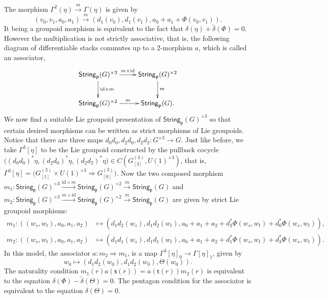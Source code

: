\documentclass[letterpaper,10pt, oneside]{article} %
\newcommand{\String}{\mathsf{String}}%
\newcommand{\bs}{\mathsf{s}}%
\newcommand{\bt}{\mathsf{t}}%
\newcommand{\frkp}{\mathfrak p}
\newcommand{\pp}{\frkp} %
\newcommand{\id}{\mathrm{id}}
\begin{document}
The morphism $\Gamma^2(\eta)\stackrel{m}{\longrightarrow}\Gamma(\eta)$
is given by
$$
(v_0,v_1,a_0,a_1)\stackrel{m}{\longrightarrow} (d_1(v_0),d_1(v_1),a_0+a_1+\Phi(v_0,v_1)).
$$It being a groupoid morphism is equivalent to the fact that
$\delta(\eta)+\check{\delta}(\Phi)=0$. However the multiplication is not
strictly associative, that is, the following diagram of differentiable stacks commutes up to a
2-morphism $a$, which is called an associator,
\[
 \xymatrix{\String_\pp(G)^{\times 3}\ar[r]^{m\times \id}\ar[d]^{\id\times m}&\String_\pp(G)^{\times 2}\ar[d]^{  m}\\
 \String_\pp(G)^{\times 2}\ar[r]^{  m}&\String_\pp(G).
 }
 \]
We now find a suitable Lie groupoid presentation of
$\String_\pp(G)^{\times 3}$ so that certain desired morphisms can be
written as strict morphisms of Lie groupoids. Notice that there are
three maps
$d_0d_0, d_2d_0, d_2d_2:G^{\times 3}\longrightarrow G$. Just like before, we take
$\Gamma^3[\eta]$
to be the Lie groupoid constructed by the pullback cocycle
$\big( (d_0d_0)^*\eta,(d_2d_0)^*\eta,(d_2d_2)^*\eta \big) \in
C(G^{(3)}_{[3]}, {\underline{U(1)}}^{\times 3})$,
that is, $
\Gamma^3[\eta]=\Big( G^{(3)}_{[1]}\times {U(1)}^{\times 3}\Longrightarrow G^{(3)}_{[0]} \Big)
$.
Now the two composed morphism $m_1:  \String_\pp(G)^{\times 3} \xrightarrow{\id\times m}
\String_\pp(G)^{\times 2} \xrightarrow{m} \String_\pp(G) $ and $m_2: \String_\pp(G)^{\times 3} \xrightarrow{m\times \id}
\String_\pp(G)^{\times 2} \xrightarrow{m} \String_\pp(G)$ are given by strict
Lie groupoid morphisms:
 \begin{eqnarray*}
   m_1:((w_s,w_t),a_0,a_1,a_2)&\longmapsto (d_1d_2(w_s),d_1d_2(w_t),a_0+a_1+a_2+d_2^*\Phi(w_s,w_t)+d_0^*\Phi(w_s,w_t)),\\
   m_2:((w_s,w_t),a_0,a_1,a_2)&\longmapsto (d_1d_1(w_s),d_1d_1(w_t),a_0+a_1+a_2+d_1^*\Phi(w_s,w_t)+d_3^*\Phi(w_s,w_t)).
 \end{eqnarray*}
In this model, the associator $a:m_2\Longrightarrow m_1$, is a
map $ \Gamma^3[\eta]_0\longrightarrow \Gamma[\eta]_1$, given by
$$w_0\longmapsto (d_1d_2(w_0),d_1d_2(w_0),\Theta(w_0)). $$
The naturality condition $m_1(r)a(\bs(r))=a(\bt(r))m_2(r)$ is
equivalent to the equation $\delta(\Phi)-\check{\delta}(\Theta)=0$. The pentagon condition for the  associator is equivalent to the equation $\delta(\Theta)=0$.
\end{document}
